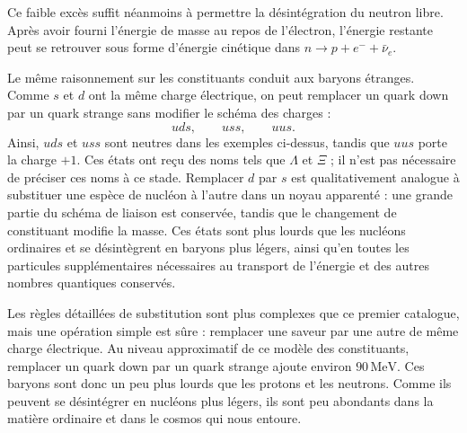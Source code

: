 \begin{classroomqa}
\end{classroomqa}

Ce faible excès suffit néanmoins à permettre la désintégration du neutron libre. Après avoir fourni l’énergie de masse au repos de l’électron, l’énergie restante peut se retrouver sous forme d’énergie cinétique dans \(n\to p+e^-+\bar\nu_e\).

Le même raisonnement sur les constituants conduit aux baryons étranges. Comme \(s\) et \(d\) ont la même charge électrique, on peut remplacer un quark down par un quark strange sans modifier le schéma des charges :
\begin{equation}
uds,\qquad uss,\qquad uus.
\end{equation}
Ainsi, \(uds\) et \(uss\) sont neutres dans les exemples ci-dessus, tandis que \(uus\) porte la charge \(+1\). Ces états ont reçu des noms tels que \(\Lambda\) et \(\Xi\) ; il n’est pas nécessaire de préciser ces noms à ce stade. Remplacer \(d\) par \(s\) est qualitativement analogue à substituer une espèce de nucléon à l’autre dans un noyau apparenté : une grande partie du schéma de liaison est conservée, tandis que le changement de constituant modifie la masse. Ces états sont plus lourds que les nucléons ordinaires et se désintègrent en baryons plus légers, ainsi qu’en toutes les particules supplémentaires nécessaires au transport de l’énergie et des autres nombres quantiques conservés.

\begin{classroomqa}
\end{classroomqa}

Les règles détaillées de substitution sont plus complexes que ce premier catalogue, mais une opération simple est sûre : remplacer une saveur par une autre de même charge électrique. Au niveau approximatif de ce modèle des constituants, remplacer un quark down par un quark strange ajoute environ \(90\,\mathrm{MeV}\). Ces baryons sont donc un peu plus lourds que les protons et les neutrons. Comme ils peuvent se désintégrer en nucléons plus légers, ils sont peu abondants dans la matière ordinaire et dans le cosmos qui nous entoure.

